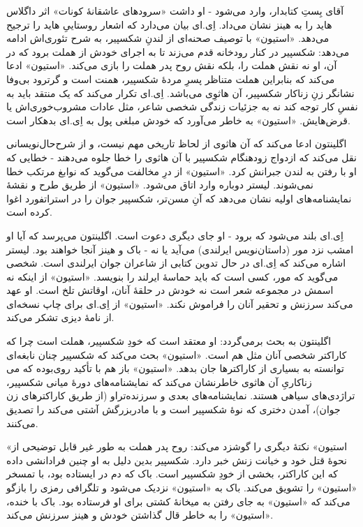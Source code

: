 \documentclass[12pt]{book}
\newcommand{\noun}[1]{«{#1}»}
\begin{document}
    آقای بِستِ کتابدار، وارد می‌شود - او داشت «سرودهای عاشقانۀ کونات» اثر داگلاس هاید را به هینز نشان می‌داد. اِی.ای بیان می‌دارد که اشعار روستاییِ هاید را ترجیح می‌دهد. \noun{استیون} با توصیف صحنه‌ای از لندنِ شکسپیر، به شرح تئوری‌اش ادامه می‌دهد: شکسپیر در کنار رودخانه قدم می‌زند تا به اجرای خودش از هملت برود که در آن، او نه نقش هملت را، بلکه نقش روح پدر هملت را بازی می‌کند. \noun{استیون} ادعا می‌کند که بنابراین هملت متناظر پسرِ مردۀ شکسپیر، همنت است و گرترود بی‌وفا نشانگر زنِ زناکار شکسپیر، آن هاثوِی می‌باشد. اِی.ای تکرار می‌کند که یک منتقد باید به نفسِ کار توجه کند نه به جزئیات زندگی شخصی شاعر، مثل عادات مشروب‌خوری‌اش یا قرض‌هایش. \noun{استیون} به خاطر می‌آورد که خودش مبلغی پول به اِی.ای بدهکار است.

    اگلینتون ادعا می‌کند که آن هاثوی از لحاظ تاریخی مهم نیست، و از شرح‌حال‌نویسانی نقل می‌کند که ازدواج زودهنگام شکسپیر با آن هاثوی را خطا جلوه می‌دهند - خطایی که او با رفتن به لندن جبرانش کرد. \noun{استیون} از درِ مخالفت می‌گوید که نوابغ مرتکب خطا نمی‌شوند. لیستر دوباره وارد اتاق می‌شود. \noun{استیون} از طریق طرح و نقشۀ نمایشنامه‌های اولیه نشان می‌دهد که آنِ مسن‌تر، شکسپیر جوان را در استراتفورد اغوا کرده است.

    اِی.ای بلند می‌شود که برود - او جای دیگری دعوت است. اگلینتون می‌پرسد که آیا او امشب نزد مور (داستان‌نویس ایرلندی) می‌آید یا نه - باک و هینز آنجا خواهند بود. لیستر اشاره می‌کند که اِی.ای در حال تدوین کتابی از شاعران جوان ایرلندی است. شخصی می‌گوید که مور، کسی است که باید حماسۀ ایرلند را بنویسد. \noun{استیون} از اینکه نه اسمش در مجموعه شعر است نه خودش در حلقۀ آنان، اوقاتش تلخ است. او عهد می‌کند سرزنش و تحقیر آنان را فراموش نکند. \noun{استیون} از اِی.ای برای چاپ نسخه‌ای از نامۀ دیزی تشکر می‌کند.

    اگلینتون به بحث برمی‌گردد: او معتقد است که خودِ شکسپیر، هملت است چرا که کاراکتر شخصی آنان مثل هم است. \noun{استیون} بحث می‌کند که شکسپیر چنان نابغه‌ای بوده که می‎‌توانسته به بسیاری از کاراکترها جان بدهد. \noun{استیون} باز هم با تأکید روی زناکاریِ آن هاثوی خاطرنشان می‌کند که نمایشنامه‌های دورۀ میانی شکسپیر، تراژدی‌های سیاهی هستند. نمایشنامه‌های بعدی و سرزنده‌تراو (از طریق کاراکترهای زن جوان)، آمدن دختری که نوۀ شکسپیر است و با مادربزرگش آشتی می‌کند را تصدیق می‌کنند.

    \noun{استیون} نکتۀ دیگری را گوشزد می‌کند: روح پدر هملت به طور غیر قابل توضیحی از نحوۀ قتل خود و خیانت زنش خبر دارد. شکسپیر بدین دلیل به او چنین فرادانشی داده که این کاراکتر، بخشی از خودِ شکسپیر است. باک که دم در ایستاده بود، با تمسخر \noun{استیون} را تشویق می‌کند. باک به \noun{استیون} نزدیک می‌شود و تلگرافی رمزی را بازگو می‌کند که \noun{استیون} به جای رفتن به میخانۀ کشتی برای او فرستاده بود. باک با خنده، \noun{استیون} را به خاطر قال گذاشتن خودش و هینز سرزنش می‌کند.
\end{document}
